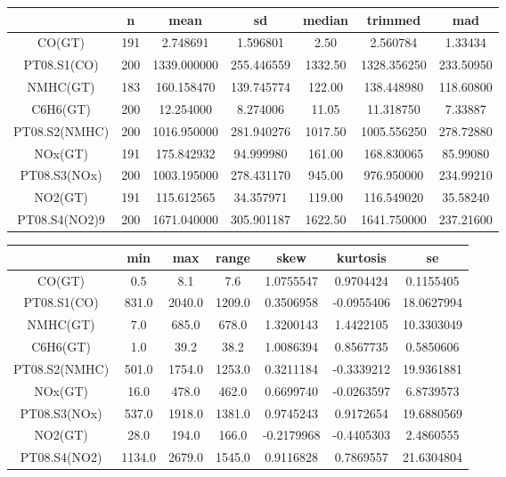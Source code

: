 \begin{table}[h]
  \centering
  \begin{tabular}{|c|c|c|c|c|c|c|}
    \hline
      & n & mean & sd & median & trimmed & mad\\
    \hline
    CO(GT) & 191 & 2.748691 & 1.596801 & 2.50 & 2.560784 & 1.33434\\
    \hline
    PT08.S1(CO) & 200 & 1339.000000 & 255.446559 & 1332.50 & 1328.356250 & 233.50950\\
    \hline
    NMHC(GT) & 183 & 160.158470 & 139.745774 & 122.00 & 138.448980 & 118.60800\\
    \hline
    C6H6(GT) & 200 & 12.254000 & 8.274006 & 11.05 & 11.318750 & 7.33887\\
    \hline
    PT08.S2(NMHC) & 200 & 1016.950000 & 281.940276 & 1017.50 & 1005.556250 & 278.72880\\
    \hline
    NOx(GT) & 191 & 175.842932 & 94.999980 & 161.00 & 168.830065 & 85.99080\\
    \hline
    PT08.S3(NOx) & 200 & 1003.195000 & 278.431170 & 945.00 & 976.950000 & 234.99210\\
    \hline
    NO2(GT) & 191 & 115.612565 & 34.357971 & 119.00 & 116.549020 & 35.58240\\
    \hline
    PT08.S4(NO2)9 & 200 & 1671.040000 & 305.901187 & 1622.50 & 1641.750000 & 237.21600\\
    \hline
  \end{tabular}

  \begin{tabular}{|c|c|c|c|c|c|c|}
    \hline
      & min & max & range & skew & kurtosis & se\\
    \hline
    CO(GT) & 0.5 & 8.1 & 7.6 & 1.0755547 & 0.9704424 & 0.1155405\\
    \hline
    PT08.S1(CO) & 831.0 & 2040.0 & 1209.0 & 0.3506958 & -0.0955406 & 18.0627994\\
    \hline
    NMHC(GT) & 7.0 & 685.0 & 678.0 & 1.3200143 & 1.4422105 & 10.3303049\\
    \hline
    C6H6(GT) & 1.0 & 39.2 & 38.2 & 1.0086394 & 0.8567735 & 0.5850606\\
    \hline
    PT08.S2(NMHC) & 501.0 & 1754.0 & 1253.0 & 0.3211184 & -0.3339212 & 19.9361881\\
    \hline
    NOx(GT) & 16.0 & 478.0 & 462.0 & 0.6699740 & -0.0263597 & 6.8739573\\
    \hline
    PT08.S3(NOx) & 537.0 & 1918.0 & 1381.0 & 0.9745243 & 0.9172654 & 19.6880569\\
    \hline
    NO2(GT) & 28.0 & 194.0 & 166.0 & -0.2179968 & -0.4405303 & 2.4860555\\
    \hline
    PT08.S4(NO2) & 1134.0 & 2679.0 & 1545.0 & 0.9116828 & 0.7869557 & 21.6304804\\
    \hline
  \end{tabular}
\end{table}

